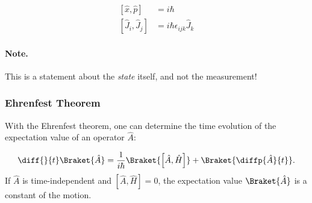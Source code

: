\begin{align}
						\left[ \hat{x}, \hat{p} \right] &= i \hbar \\
						\left[ \hat{J}_i , \hat{J}_j \right] &= i \hbar \epsilon_{ijk} \hat{J}_k
					
\end{align}
				\paragraph{Note.} This is a statement about the \emph{state} itself, and not the measurement!

\subsubsection{Ehrenfest Theorem}
				With the Ehrenfest theorem, one can determine the time evolution of the expectation value of an operator $\hat{A}$:

\begin{align}
					\diff{}{t}\Braket{\hat{A}}=\frac{1}{i\hbar}\Braket{\left[\hat{A},\hat{H}\right]}+\Braket{\diffp{\hat{A}}{t}}. \label{eq:ehrenfest} 
				
\end{align}
								If $\hat{A}$ is time-independent and $\left[\hat{A},\hat{H}\right]=0$, the expectation value $\Braket{\hat{A}}$ is a constant of the motion.